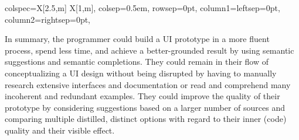 \begin{center}
\begin{tblr}{
		colspec={X[2.5,m] X[1,m]},
		colsep=0.5em,
		rowsep=0pt,
		column{1}={leftsep=0pt},
		column{2}={rightsep=0pt},
	}
	\end{tblr}
\end{center}

In summary, the programmer could build a UI prototype in a more fluent process, spend less time, and achieve a better-grounded result by using semantic suggestions and semantic completions.
They could remain in their flow of conceptualizing a UI design without being disrupted by having to manually research extensive interfaces and documentation or read and comprehend many incoherent and redundant examples.
They could improve the quality of their prototype by considering suggestions based on a larger number of sources and comparing multiple distilled, distinct options with regard to their inner (code) quality and their visible effect.

